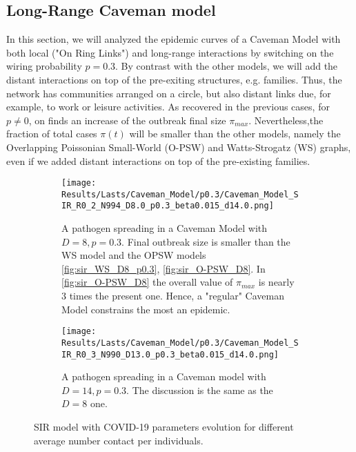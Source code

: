 \documentclass[a4paper,10pt]{book} %
\theoremstyle{definition}
\begin{document}
\clearpage
\subsection{Long-Range Caveman model}
\label{sec:res_LRCM}

In this section, we will analyzed the epidemic curves of a Caveman Model with both local ("On Ring Links") and long-range interactions by switching on the wiring probability $p = 0.3$. By contrast with the other models, we will add the distant interactions on top of the pre-exiting structures, e.g. families. Thus, the network has communities arranged on a circle, but also distant links due, for example, to work or leisure activities.
As recovered in the previous cases, for $ p \neq 0$, on finds an increase of the outbreak final size $ \pi_{max} $. Nevertheless,the fraction of total cases $\pi(t)$ will be smaller than the other models, namely the Overlapping Poissonian Small-World (O-PSW) and Watts-Strogatz (WS) graphs, even if we added distant interactions on top of the pre-existing families.
\begin{figure}[htbp]
	\centering
	\begin{subfigure}{0.9\linewidth}
		\texttt{[image: Results/Lasts/Caveman\_Model/p0.3/Caveman\_Model\_SIR\_R0\_2\_N994\_D8.0\_p0.3\_beta0.015\_d14.0.png]}
		\caption{A pathogen spreading in a Caveman Model with $D = 8, p = 0.3$. Final outbreak size is smaller than the WS model and the OPSW models \autoref{fig:sir_WS_D8_p0.3}, \autoref{fig:sir_O-PSW_D8}. In \autoref{fig:sir_O-PSW_D8} the overall value of $ \pi_{max}$ is nearly $3$ times the present one. Hence, a "regular" Caveman Model constrains the most an epidemic.}
		\label{fig:sir_CM_D8_p0.3}
	\end{subfigure}
	\par\smallskip
	\begin{subfigure}{0.9\linewidth}
		\texttt{[image: Results/Lasts/Caveman\_Model/p0.3/Caveman\_Model\_SIR\_R0\_3\_N990\_D13.0\_p0.3\_beta0.015\_d14.0.png]}
		\caption{A pathogen spreading in a Caveman model with $D = 14, p = 0.3$. The discussion is the same as the $ D = 8$ one.}
		\label{fig:sir_CM_D13_p0.3}
	\end{subfigure}
	\caption{SIR model with COVID-19 parameters evolution for different average number contact per individuals.}
	\label{fig:sir_CM_COVID_p0.3}
\end{figure}

\clearpage
\end{document}
